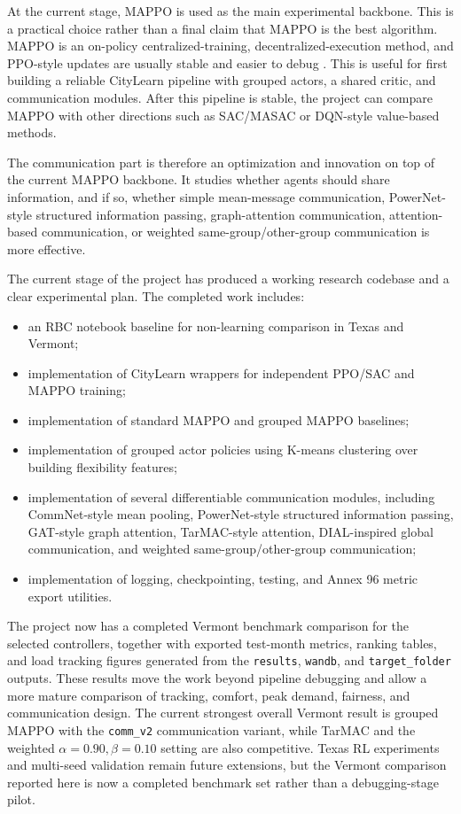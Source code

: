 At the current stage, MAPPO is used as the main experimental backbone. This is
a practical choice rather than a final claim that MAPPO is the best algorithm.
MAPPO is an on-policy centralized-training, decentralized-execution method, and
PPO-style updates are usually stable and easier to debug
\cite{ppo2017,mappo2022}. This is useful for first building a reliable
CityLearn pipeline with grouped actors, a shared critic, and communication
modules. After this pipeline is stable, the project can compare MAPPO with
other directions such as SAC/MASAC or DQN-style value-based methods.

The communication part is therefore an optimization and innovation on top of
the current MAPPO backbone. It studies whether agents should share information,
and if so, whether simple mean-message communication, PowerNet-style structured
information passing, graph-attention communication, attention-based
communication, or weighted same-group/other-group communication is more
effective.

The current stage of the project has produced a working research codebase and a
clear experimental plan. The completed work includes:

\begin{itemize}
  \item an RBC notebook baseline for non-learning comparison in Texas and
  Vermont;
  \item implementation of CityLearn wrappers for independent PPO/SAC and MAPPO
  training;
  \item implementation of standard MAPPO and grouped MAPPO baselines;
  \item implementation of grouped actor policies using K-means clustering over
  building flexibility features;
  \item implementation of several differentiable communication modules,
  including CommNet-style mean pooling, PowerNet-style structured information
  passing, GAT-style graph attention,
  TarMAC-style attention, DIAL-inspired global communication, and weighted
  same-group/other-group communication;
  \item implementation of logging, checkpointing, testing, and Annex 96 metric
  export utilities.
\end{itemize}

The project now has a completed Vermont benchmark comparison for the selected
controllers, together with exported test-month metrics, ranking tables, and load
tracking figures generated from the \texttt{results}, \texttt{wandb}, and
\texttt{target\_folder} outputs. These results move the work beyond pipeline
debugging and allow a more mature comparison of tracking, comfort, peak demand,
fairness, and communication design. The current strongest overall Vermont result
is grouped MAPPO with the \texttt{comm\_v2} communication variant, while TarMAC
and the weighted \mbox{$\alpha=0.90, \beta=0.10$} setting are also competitive.
Texas RL experiments and multi-seed validation remain future extensions, but the
Vermont comparison reported here is now a completed benchmark set rather than a
debugging-stage pilot.

